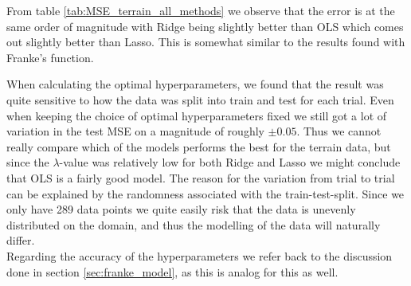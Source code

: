 \documentclass[norsk,a4paper,12pt]{scrartcl}
\begin{document}
From table \ref{tab:MSE_terrain_all_methods} we observe that the error is at the same order of magnitude with Ridge being slightly better than OLS which comes out slightly better than Lasso. This is somewhat similar to the results found with Franke's function. 


When calculating the optimal hyperparameters, we found that the result was quite sensitive to how the data was split into train and test for each trial. Even when keeping the choice of optimal hyperparameters fixed we still got a lot of variation in the test MSE on a magnitude of roughly $\pm 0.05$. Thus we cannot really compare which of the models performs the best for the terrain data, but since the $\lambda$-value was relatively low for both Ridge and Lasso we might conclude that OLS is a fairly good model. The reason for the variation from trial to trial can be explained by the randomness associated with the train-test-split. Since we only have 289 data points we quite easily risk that the data is unevenly distributed on the domain, and thus the modelling of the data will naturally differ. \\
Regarding the accuracy of the hyperparameters we refer back to the discussion done in section \ref{sec:franke_model}, as this is analog for this as well.\\
\end{document}

